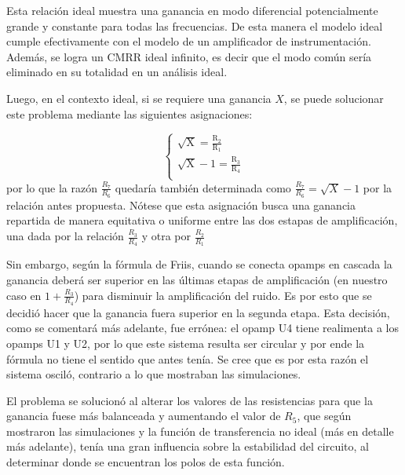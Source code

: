 \documentclass[../../tc_tp3_main.tex]{subfiles}
\begin{document}

Esta relación ideal muestra una ganancia en modo diferencial potencialmente grande y constante para todas las frecuencias. De esta manera el modelo ideal cumple efectivamente con el modelo de un amplificador de instrumentación. Además, se logra un CMRR ideal infinito, es decir que el modo común sería eliminado en su totalidad en un análisis ideal. \par

Luego, en el contexto ideal, si se requiere una ganancia $X$, se puede solucionar este problema mediante las siguientes asignaciones: \par
 	\begin{equation}
  	   \left\{
	  	    \begin{array}{ll}
		 					\mathrm{\sqrt{X} = \frac{R_2}{R_1} } \\
			 				\mathrm{\sqrt{X} - 1 = \frac{R_3}{R_4}} \\
	     	 \end{array}
	     	\right.
 	\end{equation}
 	por lo que la razón $\frac{R_7}{R_6}$ quedaría también determinada como $\frac{R_7}{R_6} = \sqrt{X} - 1$ por la relación antes propuesta. Nótese que esta asignación busca una ganancia repartida de manera equitativa o uniforme entre las dos estapas de amplificación, una dada por la relación $\frac{R_3}{R_4}$ y otra por $\frac{R_2}{R_1}$\par
 	Sin embargo, según la fórmula de Friis, cuando se conecta opamps en cascada la ganancia deberá ser superior en las últimas etapas de amplificación (en nuestro caso en $1+\frac{R_3}{R_4}$) para disminuir la amplificación del ruido. Es por esto que se decidió hacer que la ganancia fuera superior en la segunda etapa. Esta decisión, como se comentará más adelante, fue errónea: el opamp U4 tiene realimenta a los opamps U1 y U2, por lo que este sistema resulta ser circular y por ende la fórmula no tiene el sentido que antes tenía. Se cree que es por esta razón el sistema osciló, contrario a lo que mostraban las simulaciones.\par
El problema se solucionó al alterar los valores de las resistencias para que la ganancia fuese más balanceada y aumentando el valor de $R_5$, que según mostraron las simulaciones y la función de transferencia no ideal (más en detalle más adelante), tenía una gran influencia sobre la estabilidad del circuito, al determinar donde se encuentran los polos de esta función.\par
 	
\end{document}
